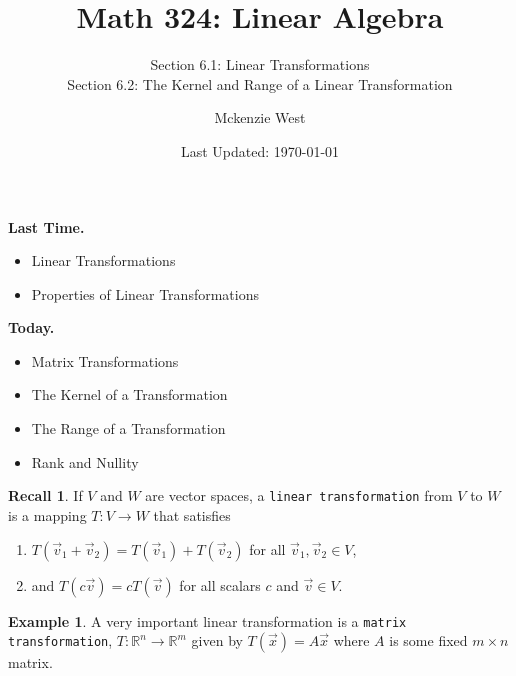 \documentclass{beamer}
\newcommand{\R}{\mathbb{R}}
\newcommand{\fn}{\insertframenumber}
\theoremstyle{definition}
\newtheorem*{exa}{Example}
\newtheorem*{recall}{Recall}
\renewcommand{\emph}[1]{{\color{blue}\texttt{#1}}}
\begin{document}
	\title{Math 324: Linear Algebra}
	\subtitle{Section 6.1: Linear Transformations\\
	Section 6.2: The Kernel and Range of a Linear Transformation}
	\author{Mckenzie West}
	\date{Last Updated: \today}
\begin{frame}
\maketitle
\end{frame}

\begin{frame}{\insertframenumber}
	\begin{block}{\textbf{Last Time.}}
	\begin{itemize}[label=--]
		\item Linear Transformations
		\item Properties of Linear Transformations
	\end{itemize}
	\end{block}
	\begin{block}{\textbf{Today.}}
		\begin{itemize}[label=--]
			\item Matrix Transformations
			\item The Kernel of a Transformation
			\item The Range of a Transformation
			\item Rank and Nullity
		\end{itemize}
	\end{block}
\end{frame}
\begin{frame}{\fn}
	\begin{recall}
		If $V$ and $W$ are vector spaces, a \emph{linear transformation} from $V$ to $W$ is a mapping $T\colon V\to W$ that satisfies
			\begin{enumerate}[label=(\alph*)]
				\item $T(\vec v_1+\vec v_2)=T(\vec v_1)+T(\vec v_2)$ for all $\vec v_1,\vec v_2\in V$,
				\item and $T(c\vec v)=cT(\vec v)$ for all scalars $c$ and $\vec v\in V$.
			\end{enumerate}
	\end{recall}
	\begin{exa}
	A very important linear transformation is a \emph{matrix transformation}, $T\colon \R^n\to\R^m$ given by $T(\vec x)=A\vec x$ where $A$ is some fixed $m\times n$ matrix.
	\end{exa}
\end{frame}
\end{document}
